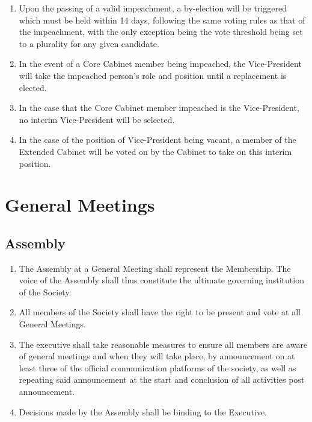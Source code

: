\documentclass[parskip=half]{scrartcl}
\begin{document}
\begin{enumerate}
                \item Upon the passing of a valid impeachment, a by-election will be triggered which must be held within 14 days, following the same voting rules as that of the impeachment, with the only exception being the vote threshold being set to a plurality for any given candidate.

                \item In the event of a Core Cabinet member being impeached, the Vice-President will take the impeached person’s role and position until a replacement is elected.
                
                \item In the case that the Core Cabinet member impeached is the Vice-President, no interim Vice-President will be selected.
                
                \item In the case of the position of Vice-President being vacant, a member of the Extended Cabinet will be voted on by the Cabinet to take on this interim position.
            \end{enumerate}
            
    \clearpage
    \section{General Meetings}
        \label{gm}
        \subsection{Assembly}
            \label{gm--assembly}
            \begin{enumerate}
                \item The Assembly at a General Meeting shall represent the Membership.
                    \subitem The voice of the Assembly shall thus constitute the ultimate governing institution of the Society.
                    
                \item All members of the Society shall have the right to be present and vote at all General Meetings.
                \item The executive shall take reasonable measures to ensure all members are aware of general meetings and when they will take place, by announcement on at least three of the official communication platforms of the society, as well as repeating said announcement  at the start and conclusion of all activities post announcement.
                \item Decisions made by the Assembly shall be binding to the Executive.
            \end{enumerate}
        
\end{document}
